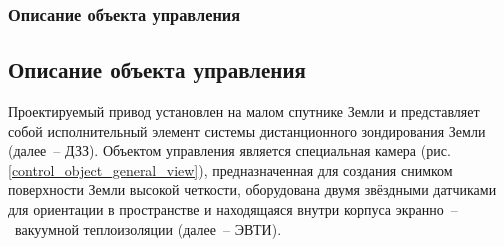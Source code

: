 \ifdefined\DIPLOMA
    \subsubsection{Описание объекта управления}
    \label{sec_controlled_object_desc}
\else
    \subsection{Описание объекта управления}
\fi

Проектируемый привод установлен на малом спутнике Земли и представляет собой
исполнительный элемент системы дистанционного зондирования Земли (далее~-- ДЗЗ).
Объектом управления является специальная камера (рис. \ref{control_object_general_view}),
предназначенная для создания снимком поверхности Земли высокой четкости,
оборудована двумя звёздными датчиками для ориентации в пространстве и
находящаяся внутри корпуса экранно~--~вакуумной теплоизоляции (далее~-- ЭВТИ).

